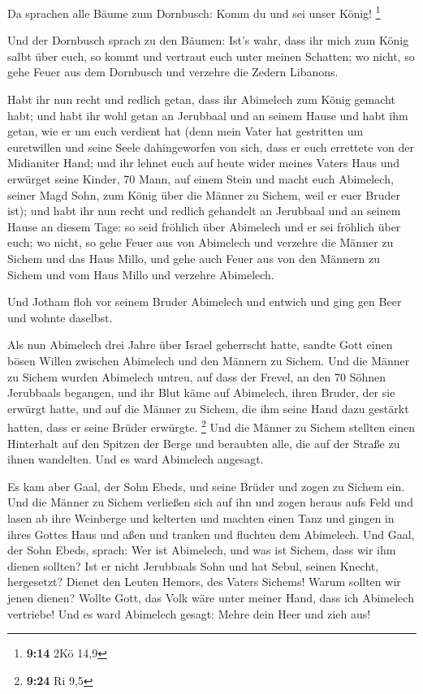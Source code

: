  Da sprachen alle Bäume zum Dornbusch: Komm du und sei
unser König! \footnote{\textbf{9:14} 2Kö 14,9}

 Und der Dornbusch sprach zu den Bäumen: Ist's wahr, dass
ihr mich zum König salbt über euch, so kommt und vertraut euch unter
meinen Schatten; wo nicht, so gehe Feuer aus dem Dornbusch und verzehre
die Zedern Libanons.

 Habt ihr nun recht und redlich getan, dass ihr Abimelech
zum König gemacht habt; und habt ihr wohl getan an Jerubbaal und an
seinem Hause und habt ihm getan, wie er um euch verdient hat
 (denn mein Vater hat gestritten um euretwillen und seine
Seele dahingeworfen von sich, dass er euch errettete von der Midianiter
Hand;  und ihr lehnet euch auf heute wider meines Vaters
Haus und erwürget seine Kinder, 70 Mann, auf einem Stein und macht euch
Abimelech, seiner Magd Sohn, zum König über die Männer zu Sichem, weil
er euer Bruder ist);  und habt ihr nun recht und redlich
gehandelt an Jerubbaal und an seinem Hause an diesem Tage: so seid
fröhlich über Abimelech und er sei fröhlich über euch;  wo
nicht, so gehe Feuer aus von Abimelech und verzehre die Männer zu Sichem
und das Haus Millo, und gehe auch Feuer aus von den Männern zu Sichem
und vom Haus Millo und verzehre Abimelech.

 Und Jotham floh vor seinem Bruder Abimelech und entwich
und ging gen Beer und wohnte daselbst.

 Als nun Abimelech drei Jahre über Israel geherrscht hatte,
 sandte Gott einen bösen Willen zwischen Abimelech und den
Männern zu Sichem. Und die Männer zu Sichem wurden Abimelech untreu,
 auf dass der Frevel, an den 70 Söhnen Jerubbaals begangen,
und ihr Blut käme auf Abimelech, ihren Bruder, der sie erwürgt hatte,
und auf die Männer zu Sichem, die ihm seine Hand dazu gestärkt hatten,
dass er seine Brüder erwürgte. \footnote{\textbf{9:24} Ri 9,5}
 Und die Männer zu Sichem stellten einen Hinterhalt auf den
Spitzen der Berge und beraubten alle, die auf der Straße zu ihnen
wandelten. Und es ward Abimelech angesagt.

 Es kam aber Gaal, der Sohn Ebeds, und seine Brüder und
zogen zu Sichem ein. Und die Männer zu Sichem verließen sich auf ihn
 und zogen heraus aufs Feld und lasen ab ihre Weinberge und
kelterten und machten einen Tanz und gingen in ihres Gottes Haus und
aßen und tranken und fluchten dem Abimelech.  Und Gaal, der
Sohn Ebeds, sprach: Wer ist Abimelech, und was ist Sichem, dass wir ihm
dienen sollten? Ist er nicht Jerubbaals Sohn und hat Sebul, seinen
Knecht, hergesetzt? Dienet den Leuten Hemors, des Vaters Sichems! Warum
sollten wir jenen dienen?  Wollte Gott, das Volk wäre unter
meiner Hand, dass ich Abimelech vertriebe! Und es ward Abimelech gesagt:
Mehre dein Heer und zieh aus!

